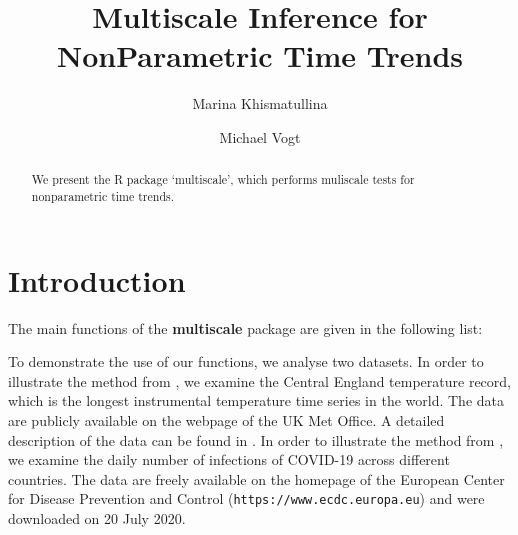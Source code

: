 \documentclass[a4paper]{scrartcl}
\title{Multiscale Inference for NonParametric Time Trends}
\author{Marina Khismatullina \and Michael Vogt}
\begin{document}


\maketitle

\begin{abstract}
We present the R package `multiscale', which performs muliscale tests for nonparametric time trends.
\end{abstract}

\tableofcontents

\section{Introduction}
The main functions of the \textbf{multiscale} package are given in
the following list:


To demonstrate the use of our functions, we analyse two datasets. In order to illustrate the method from \cite{KhismatullinaVogt2020a}, we examine the Central England temperature record, which is the longest instrumental temperature time series in the world. The data are publicly available on the webpage of the UK Met Office. A detailed description of the data can be found in \cite{Parker1992}. In order to illustrate the method from \cite{KhismatullinaVogt2020b}, we examine the daily number of infections of COVID-19 across different countries. The data are freely available on the homepage of the European Center for Disease Prevention and Control (\texttt{https://www.ecdc.europa.eu}) and were downloaded on 20 July 2020.
\end{document}
